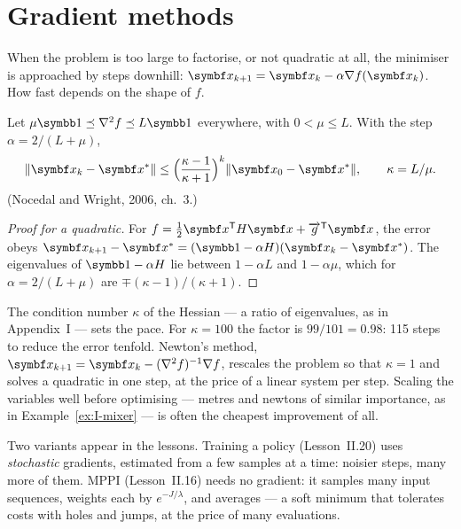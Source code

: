 \section{Gradient methods}

When the problem is too large to factorise, or not quadratic at all, the minimiser is approached by steps downhill: $\vx_{k+1} = \vx_k - \alpha\nabla f(\vx_k)$. How fast depends on the shape of $f$.

\begin{theorem}
\label{thm:J-gd}
Let $\mu\Id \preceq \nabla^2f \preceq L\Id$ everywhere, with $0 < \mu \le L$. With the step $\alpha = 2/(L + \mu)$,
\begin{equation}\label{eq:J-gd}
  \|\vx_k - \vx^*\| \le \Big(\frac{\kappa - 1}{\kappa + 1}\Big)^k\|\vx_0 - \vx^*\|, \qquad \kappa = L/\mu .
\end{equation}
(Nocedal and Wright, 2006, ch.~3.)
\end{theorem}
\begin{proof}[Proof for a quadratic]
For $f = \tfrac12\vx^\T H\vx + \vec g^\T\vx$, the error obeys $\vx_{k+1} - \vx^* = (\Id - \alpha H)(\vx_k - \vx^*)$. The eigenvalues of $\Id - \alpha H$ lie between $1 - \alpha L$ and $1 - \alpha\mu$, which for $\alpha = 2/(L + \mu)$ are $\mp(\kappa - 1)/(\kappa + 1)$.
\end{proof}

The condition number $\kappa$ of the Hessian — a ratio of eigenvalues, as in Appendix~I — sets the pace. For $\kappa = 100$ the factor is $99/101 = 0.98$: 115 steps to reduce the error tenfold. Newton's method, $\vx_{k+1} = \vx_k - (\nabla^2f)^{-1}\nabla f$, rescales the problem so that $\kappa = 1$ and solves a quadratic in one step, at the price of a linear system per step. Scaling the variables well before optimising — metres and newtons of similar importance, as in Example~\ref{ex:I-mixer} — is often the cheapest improvement of all.

Two variants appear in the lessons. Training a policy (Lesson~II.20) uses \emph{stochastic} gradients, estimated from a few samples at a time: noisier steps, many more of them. MPPI (Lesson~II.16) needs no gradient: it samples many input sequences, weights each by $e^{-J/\lambda}$, and averages — a soft minimum that tolerates costs with holes and jumps, at the price of many evaluations.

